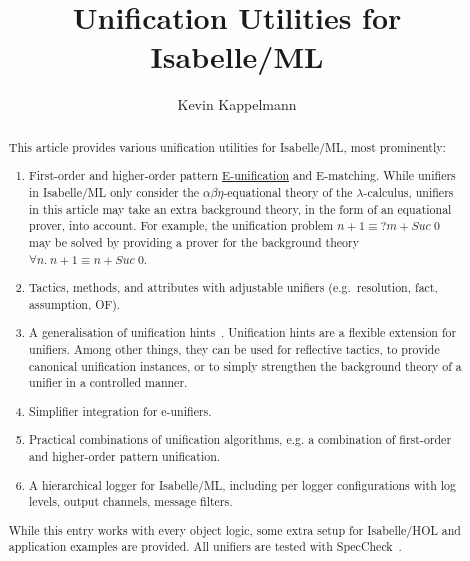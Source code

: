 \documentclass[11pt,a4paper]{article}
\begin{document}
\title{Unification Utilities for Isabelle/ML}
\author{Kevin Kappelmann}
\maketitle

\begin{abstract}
This article provides various unification utilities for Isabelle/ML, most prominently:
\begin{enumerate}
\item First-order and higher-order pattern
\href{https://en.wikipedia.org/wiki/Unification_(computer_science)#E-unification}{E-unification}
and E-matching.
While unifiers in Isabelle/ML only consider the $\alpha\beta\eta$-equational theory of the $\lambda$-calculus,
unifiers in this article
may take an extra background theory, in the form of an equational prover, into account.
For example, the unification problem $n + 1 \equiv {}?m + Suc\; 0$
may be solved by providing a prover for the background theory $\forall n.\ n + 1 \equiv n + Suc\; 0$.
\item Tactics, methods, and attributes with adjustable unifiers (e.g.\ resolution, fact, assumption, OF).
\item A generalisation of unification hints~\cite{unif-hints}.
Unification hints are a flexible extension for unifiers.
Among other things, they can be used for reflective tactics,
to provide canonical unification instances,
or to simply strengthen the background theory of a unifier in a controlled manner.
\item Simplifier integration for e-unifiers.
\item Practical combinations of unification algorithms, e.g. a combination of first-order and
higher-order pattern unification.
\item A hierarchical logger for Isabelle/ML,
including per logger configurations with log levels, output channels, message filters.
\end{enumerate}
While this entry works with every object logic,
some extra setup for Isabelle/HOL and application examples are provided.
All unifiers are tested with SpecCheck~\cite{speccheck}.
\end{abstract}

\tableofcontents





\end{document}
